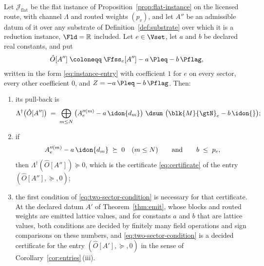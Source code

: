 \begin{corollary}\label{cor:two-sector-decided}
Let $\mathcal{J}_{\mathrm{flat}}$ be the flat instance of
Proposition~\ref{prop:flat-instance} on the licensed route, with channel
$\Lambda$ and routed weights $(p_v)$, and let $A''$ be an admissible datum of
it over any substrate of Definition~\ref{def:substrate} over which it is a
reduction instance, $\Fld=\mathbb{R}$ included. Let $e\in\Vset$, let $a$ and $b$ be declared real constants, and put
\begin{equation}\label{eq:two-sector-at}
  \hat O[A'']\;\coloneqq\;\Ffss_e[A'']-a\,\Pleq-b\,\Pflag ,
\end{equation}
written in the form \eqref{eq:instance-entry} with coefficient $1$ for $e$
on every sector, every other coefficient $0$, and $Z=-a\,\Pleq-b\,\Pflag$.
Then:
\begin{enumerate}[label=(\roman*),leftmargin=3.0em]
\item its pull-back is
  \begin{equation}\label{eq:two-sector-pullback}
    \Lambda^{\dagger}\big(\hat O[A'']\big)
    \;=\;\bigoplus_{m\le N}\big(A''^{(m)}_e-a\,\idon{d_m}\big)
    \ \dsum\ \big(\blk{M}{\gtN}_e-b\,\idon{}\big);
  \end{equation}
\item if
  \begin{equation}\label{eq:two-sector-condition}
    A''^{(m)}_e-a\,\idon{d_m}\;\succeq\;0\quad(m\le N)
    \qquad\text{and}\qquad b\;\le\;p_e ,
  \end{equation}
  then $\Lambda^{\dagger}(\hat O[A''])\succeq0$, which is the certificate
  \eqref{eq:certificate} of the entry $(\hat O[A''],\succeq,0)$;
\item the first condition of \eqref{eq:two-sector-condition} is necessary for
  that certificate. At the declared datum $A'$ of Theorem~\ref{thm:emit},
  whose blocks and routed weights are emitted lattice values, and for
  constants $a$ and $b$ that are lattice values, both conditions are decided
  by finitely many field operations and sign comparisons on these numbers,
  and \eqref{eq:two-sector-condition} is a decided certificate for the entry
  $(\hat O[A'],\succeq,0)$ in the sense of
  Corollary~\ref{cor:entries}\,(iii).
\end{enumerate}
\end{corollary}

